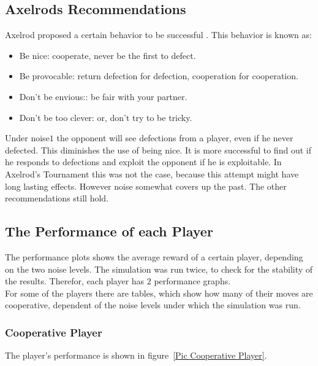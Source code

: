 \subsection{Axelrods Recommendations}
Axelrod proposed a certain behavior to be successful \cite{axelrod}. This behavior is known as:
\begin{itemize}
 \item     Be nice: cooperate, never be the first to defect.\\[-6mm]
 \item Be provocable: return defection for defection, cooperation for cooperation.\\[-6mm]
\item Don't be envious:: be fair with your partner.\\[-6mm]
\item  Don't be too clever: or, don't try to be tricky.\cite{recon}
\end{itemize}

Under noise$1$ the opponent will see defections from a player, even if he never defected. This diminishes the use of being nice. It is more successful to find out if he responds to defections and exploit the opponent if he is exploitable. In Axelrod's Tournament this was not the case, because this attempt might have long lasting effects. However noise somewhat covers up the past. The other recommendations still hold.

\subsection{The Performance of each Player}

The performance plots shows the average reward of a certain player, depending on the two noise levels. The simulation was run twice, to check for the stability of the results. Therefor, each player has $2$ performance graphs.\\

For some of the players there are tables, which show how many of their moves are cooperative, dependent of the noise levels under which the simulation was run. 

\subsubsection{Cooperative Player}

The player's performance is shown in figure~\ref{Pic Cooperative Player}.\\

